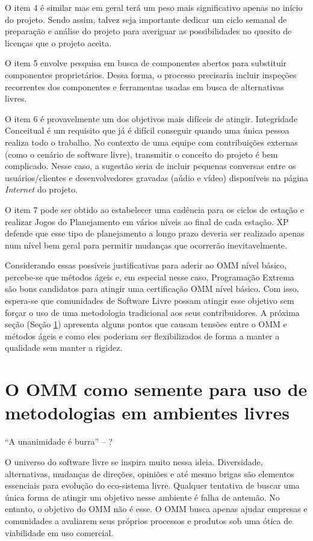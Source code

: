 O item 4 é similar mas em geral terá um peso mais significativo apenas
no início do projeto. Sendo assim, talvez seja importante dedicar um
ciclo semanal de preparação e análise do projeto para averiguar as
possibilidades no quesito de licenças que o projeto aceita.

O item 5 envolve pesquisa em busca de componentes abertos para
substituir componentes proprietários. Dessa forma, o processo
precisaria incluir inspeções recorrentes dos componentes e ferramentas
usadas em busca de alternativas livres.

O item 6 é provavelmente um dos objetivos mais difíceis de
atingir. Integridade Conceitual é um requisito que já é difícil
conseguir quando uma única pessoa realiza todo o trabalho. No contexto
de uma equipe com contribuições externas (como o cenário de software
livre), transmitir o conceito do projeto é bem complicado. Nesse caso,
a sugestão seria de incluir pequenas conversas entre os
usuários/clientes e desenvolvedores gravadas (aúdio e vídeo)
disponíveis na página \textit{Internet} do projeto.

O item 7 pode ser obtido ao estabelecer uma cadência para os ciclos de
estação e realizar Jogos do Planejamento em vários níveis ao final de
cada estação. XP defende que esse tipo de planejamento a longo prazo
deveria ser realizado apenas num nível bem geral para permitir
mudanças que ocorrerão inevitavelmente.

Considerando essas possíveis justificativas para aderir ao OMM nível
básico, percebe-se que métodos ágeis e, em especial nesse caso,
Programação Extrema são bons candidatos para atingir uma certificação
OMM nível básico. Com isso, espera-se que comunidades de Software
Livre possam atingir esse objetivo sem forçar o uso de uma metodologia
tradicional aos seus contribuidores. A próxima seção (Seção
\ref{sec:sl+omm}) apresenta alguns pontos que causam tensões
entre o OMM e métodos ágeis e como eles poderiam ser flexibilizados de
forma a manter a qualidade sem manter a rigidez.

\section[OMM no contexto livre]{O OMM como semente para uso de
  metodologias em ambientes livres}
\label{sec:sl+omm}

``A unanimidade é burra'' -- ?


O universo do software livre se inspira muito nessa
ideia. Diversidade, alternativas, mudanças de direções, opiniões e até
mesmo brigas são elementos essenciais para evolução do eco-sistema
livre. Qualquer tentativa de buscar uma única forma de atingir um
objetivo nesse ambiente é falha de antemão. No entanto, o objetivo do
OMM não é esse. O OMM busca apenas ajudar empresas e comunidades a
avaliarem seus próprios processos e produtos sob uma ótica de
viabilidade em uso comercial.

